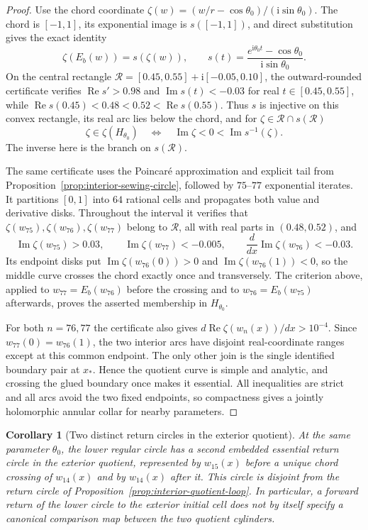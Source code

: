 \documentclass[11pt,a4paper]{article}
\newtheorem{corollary}[theorem]{Corollary}
\theoremstyle{definition}
\newcommand{\ii}{\mathrm{i}}
\begin{document}
\begin{proof}
Use the chord coordinate
$\zeta(w)=(w/r-\cos\theta_0)/(\ii\sin\theta_0)$.
The chord is $[-1,1]$, its exponential image is
$s([-1,1])$, and direct substitution gives the exact identity
\[
 \zeta(E_b(w))=s(\zeta(w)),\qquad
 s(t)=\frac{e^{\ii\theta_0t}-\cos\theta_0}
              {\ii\sin\theta_0}.
\]
On the central rectangle
$\mathcal R=[0.45,0.55]+\ii[-0.05,0.10]$, the outward-rounded
certificate verifies
$\operatorname{Re}s'>0.98$ and
$\operatorname{Im}s(t)<-0.03$ for real
$t\in[0.45,0.55]$, while
$\operatorname{Re}s(0.45)<0.48<0.52<\operatorname{Re}s(0.55)$.
Thus $s$ is injective on this convex rectangle,
its real arc lies below the chord, and for
$\zeta\in\mathcal R\cap s(\mathcal R)$
\[
 \zeta\in\zeta(H_{\theta_0})
 \quad\Longleftrightarrow\quad
 \operatorname{Im}\zeta<0<\operatorname{Im}s^{-1}(\zeta).
\]
The inverse here is the branch on $s(\mathcal R)$.

The same certificate uses the Poincar\'e approximation and explicit
tail from Proposition~\ref{prop:interior-sewing-circle}, followed by
$75$--$77$ exponential iterates.  It partitions $[0,1]$ into $64$
rational cells and propagates both value and derivative disks.
Throughout the interval it verifies that
$\zeta(w_{75}),\zeta(w_{76}),\zeta(w_{77})$ belong to
$\mathcal R$, all with real parts in $(0.48,0.52)$, and
\[
 \operatorname{Im}\zeta(w_{75})>0.03,
 \qquad \operatorname{Im}\zeta(w_{77})<-0.005,
 \qquad \frac{d}{dx}\operatorname{Im}\zeta(w_{76})<-0.03.
\]
Its endpoint disks put
$\operatorname{Im}\zeta(w_{76}(0))>0$ and
$\operatorname{Im}\zeta(w_{76}(1))<0$, so the middle curve crosses
the chord exactly once and transversely.  The criterion above,
applied to $w_{77}=E_b(w_{76})$ before the crossing and to
$w_{76}=E_b(w_{75})$ afterwards, proves the asserted membership
in $H_{\theta_0}$.

For both $n=76,77$ the certificate also gives
$d\operatorname{Re}\zeta(w_n(x))/dx>10^{-4}$.
Since $w_{77}(0)=w_{76}(1)$, the two interior arcs have disjoint
real-coordinate ranges except at this common endpoint.  The only
other join is the single identified boundary pair at $x_*$.
Hence the quotient curve is simple and analytic, and crossing the
glued boundary once makes it essential.  All inequalities are
strict and all arcs avoid the two fixed endpoints, so compactness
gives a jointly holomorphic annular collar for nearby parameters.
\end{proof}

\begin{corollary}[Two distinct return circles in the exterior quotient]
\label{cor:interior-two-returns}
At the same parameter $\theta_0$, the lower regular circle has a second
embedded essential return circle in the exterior quotient, represented
by $w_{15}(x)$ before a unique chord crossing of $w_{14}(x)$ and by
$w_{14}(x)$ after it.  This circle is disjoint from the return circle
of Proposition~\ref{prop:interior-quotient-loop}.  In particular, a
forward return of the lower circle to the exterior initial cell does
not by itself specify a canonical comparison map between the two
quotient cylinders.
\end{corollary}
\end{document}
